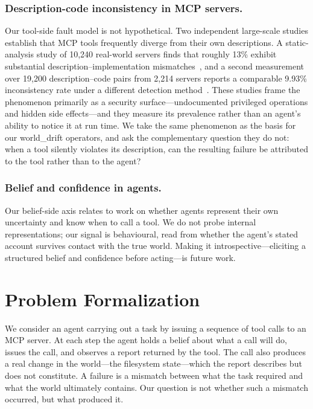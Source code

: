 \documentclass[runningheads]{llncs}
\begin{document}
\subsubsection{Description-code inconsistency in MCP servers.}
Our tool-side fault model is not hypothetical. Two independent large-scale studies establish that MCP tools frequently diverge from their own descriptions. A static-analysis study of 10{,}240 real-world servers finds that roughly 13\% exhibit substantial description--implementation mismatches~\cite{mcpmislead}, and a second measurement over 19{,}200 description--code pairs from 2{,}214 servers reports a comparable 9.93\% inconsistency rate under a different detection method~\cite{mcpincon}. These studies frame the phenomenon primarily as a security surface---undocumented privileged operations and hidden side effects---and they measure its prevalence rather than an agent's ability to notice it at run time. We take the same phenomenon as the basis for our \textsf{world\_drift} operators, and ask the complementary question they do not: when a tool silently violates its description, can the resulting failure be attributed to the tool rather than to the agent?

\subsubsection{Belief and confidence in agents.} Our belief-side axis relates to work on whether agents represent their own uncertainty and know when to call a tool. We do not probe internal representations; our signal is behavioural, read from whether the agent's stated account survives contact with the true world. Making it introspective---eliciting a structured belief and confidence before acting---is future work.

\section{Problem Formalization}
\label{sec:problem}

We consider an agent carrying out a task by issuing a sequence of tool calls to an MCP server. At each step the agent holds a belief about what a call will do, issues the call, and observes a report returned by the tool. The call also produces a real change in the world---the filesystem state---which the report describes but does not constitute. A failure is a mismatch between what the task required and what the world ultimately contains. Our question is not whether such a mismatch occurred, but what produced it.
\end{document}
